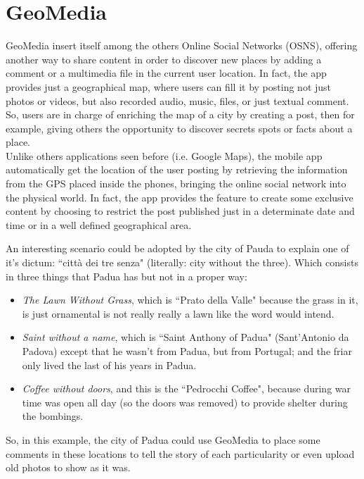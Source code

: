 \documentclass[conference]{IEEEtran}
\begin{document}
\section{GeoMedia}

GeoMedia insert itself among the others Online Social Networks (OSNS), offering another way to share content in order to discover new places by adding a comment or a multimedia file in the current user location.
In fact, the app provides just a geographical map, where users can fill it by posting
not just photos or videos, but also recorded audio, music, files, or just textual comment.
So, users are in charge of enriching the map of a city by creating a post, then for example, giving others the opportunity to discover secrets spots or facts about a place.
\\
Unlike others applications seen before (i.e. Google Maps), the mobile app automatically get the location of the user posting by retrieving the information from the GPS placed inside the phones, bringing the online social network into the physical world. In fact, the app provides the feature to create some exclusive content by choosing to restrict the post published just in a determinate date and time or in a well defined geographical area.

An interesting scenario could be adopted by the city of Pauda to explain one of it's dictum: ``città dei tre senza" (literally: city without the three).
Which consists in three things that Padua has but not in a proper way:
\begin{itemize}
    \item \textit{The Lawn Without Grass}, which is ``Prato della Valle" because the grass in it, is just ornamental is not really really a lawn like the word would intend.
    \item \textit{Saint without a name}, which is ``Saint Anthony of Padua" (Sant'Antonio da Padova) except that he wasn't from Padua, but from Portugal; and the friar only lived the last of his years in Padua.
    \item \textit{Coffee without doors}, and this is the ``Pedrocchi Coffee", because during war time was open all day (so the doors was removed) to provide shelter during the bombings.
\end{itemize}
So, in this example, the city of Padua could use GeoMedia to place some comments in these locations to tell the story of each particularity or even upload old photos to show as it was.
\\
\end{document}
